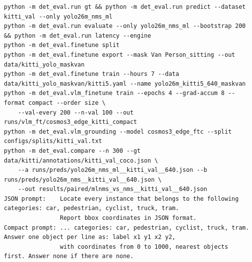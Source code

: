 \documentclass[conference]{IEEEtran}
\begin{document}
\begin{table}[t]
\centering
\caption{Every run, grouped by configuration and machine, from its manifest. Data gives dataset and input size in
pixels (VLM rows: frame counts at native resolution). Below: representative commands and the two VLM prompts.}
\label{tab:repro}
\scriptsize
\setlength{\tabcolsep}{3pt}

\vspace{6pt}
\begin{minipage}{\textwidth}
\scriptsize
\begin{verbatim}
python -m det_eval.run gt && python -m det_eval.run predict --dataset kitti_val --only yolo26m_nms_ml
python -m det_eval.run evaluate --only yolo26m_nms_ml --bootstrap 200 && python -m det_eval.run latency --engine
python -m det_eval.finetune split
python -m det_eval.finetune export --mask Van Person_sitting --out data/kitti_yolo_maskvan
python -m det_eval.finetune train --hours 7 --data data/kitti_yolo_maskvan/kitti5.yaml --name yolo26m_kitti5_640_maskvan
python -m det_eval.vlm_finetune train --epochs 4 --grad-accum 8 --format compact --order size \
    --val-every 200 --n-val 100 --out runs/vlm_ft/cosmos3_edge_kitti_compact
python -m det_eval.vlm_grounding --model cosmos3_edge_ftc --split configs/splits/kitti_val.txt
python -m det_eval.compare --n 300 --gt data/kitti/annotations/kitti_val_coco.json \
    --a runs/preds/yolo26m_nms_ml__kitti_val__640.json --b runs/preds/yolo26m_nms__kitti_val__640.json \
    --out results/paired/mlnms_vs_nms__kitti_val__640.json
JSON prompt:    Locate every instance that belongs to the following categories: car, pedestrian, cyclist, truck, tram.
                Report bbox coordinates in JSON format.
Compact prompt: ... categories: car, pedestrian, cyclist, truck, tram. Answer one object per line as: label x1 y1 x2 y2,
                with coordinates from 0 to 1000, nearest objects first. Answer none if there are none.
\end{verbatim}
\end{minipage}
\end{table}



\end{document}
